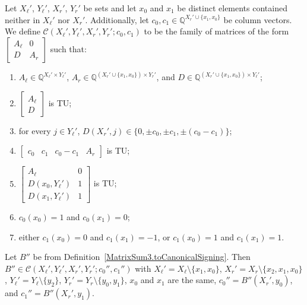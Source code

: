 \begin{definition}
    \label{MatrixLikeSum3}
    \leanok
    Let $X_{\ell}'$, $Y_{\ell}'$, $X_{r}'$, $Y_{r}'$ be sets and let $x_{0}$ and $x_{1}$ be distinct elements contained neither in $X_{\ell}'$ nor $X_{r}'$. Additionally, let $c_{0}, c_{1} \in \mathbb{Q}^{X_{r}' \cup \{x_{1}, x_{0}\}}$ be column vectors. We define $\mathcal{C} (X_{\ell}', Y_{\ell}', X_{r}', Y_{r}'; c_{0}, c_{1})$ to be the family of matrices of the form $\begin{bmatrix} A_{\ell} & 0 \\ D & A_{r} \end{bmatrix}$ such that:
    \begin{enumerate}
        \item $A_{\ell} \in \mathbb{Q}^{X_{\ell}' \times Y_{\ell}'}$, $A_{r} \in \mathbb{Q}^{(X_{r}' \cup \{x_{1}, x_{0}\}) \times Y_{r}'}$, and $D \in \mathbb{Q}^{(X_{r}' \cup \{x_{1}, x_{0}\}) \times Y_{\ell}'}$;
        \item\label{item:mls3_LeftTU} $\begin{bmatrix} A_{\ell} \\ D \end{bmatrix}$ is TU;
        \item\label{item:mls3_Parallels} for every $j \in Y_{\ell}'$, $D (X_{r}', j) \in \{0, \pm c_{0}, \pm c_{1}, \pm (c_{0} - c_{1})\}$;
        \item\label{item:mls3_BottomTU} $\begin{bmatrix} c_{0} & c_{1} & c_{0} - c_{1} & A_{r} \end{bmatrix}$ is TU;
        \item\label{item:mls3_AuxTU} $\begin{bmatrix} A_{\ell} & 0 \\ D (x_{0}, Y_{\ell}') & 1 \\ D (x_{1}, Y_{\ell}') & 1 \end{bmatrix}$ is TU;
        \item\label{item:mls3_Col0} $c_{0} (x_{0}) = 1$ and $c_{0} (x_{1}) = 0$;
        \item\label{item:mls3_Col1} either $c_{1} (x_{0}) = 0$ and $c_{1} (x_{1}) = -1$, or $c_{1} (x_{0}) = 1$ and $c_{1} (x_{1}) = 1$.
    \end{enumerate}
\end{definition}

\begin{lemma}
    \label{MatrixSum3.IsCanonicalSigning.toMatrixLikeSum3}
    \leanok
    Let $B''$ be from Definition~\ref{MatrixSum3.toCanonicalSigning}. Then $B'' \in \mathcal{C} (X_{\ell}', Y_{\ell}', X_{r}', Y_{r}'; c_{0}'', c_{1}'')$ with $X_{\ell}' = X_{\ell} \setminus \{x_{1}, x_{0}\}$, $X_{r}' = X_{r} \setminus \{x_{2}, x_{1}, x_{0}\}$, $Y_{\ell}' = Y_{\ell} \setminus \{y_{2}\}$, $Y_{r}' = Y_{r} \setminus \{y_{0}, y_{1}\}$, $x_{0}$ and $x_{1}$ are the same, $c_{0}'' = B'' (X_{r}', y_{0})$, and $c_{1}'' = B'' (X_{r}', y_{1})$.
\end{lemma}

